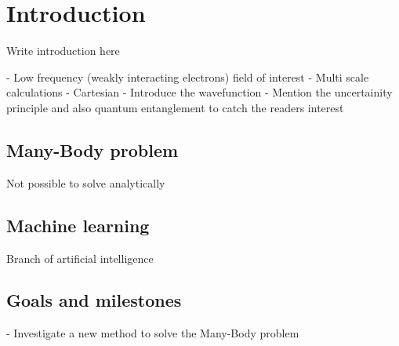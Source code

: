 \chapter{Introduction}
Write introduction here

 - Low frequency (weakly interacting electrons) field of interest
 - Multi scale calculations
 - Cartesian
 - Introduce the wavefunction
 - Mention the uncertainity principle and also quantum entanglement to catch the readers interest
 
 
\section{Many-Body problem} \label{subsec:manybodyproblem}
Not possible to solve analytically

\section{Machine learning} \label{subsec:machinelearning}
Branch of artificial intelligence

\section{Goals and milestones} \label{subsec:goals}
- Investigate a new method to solve the Many-Body problem